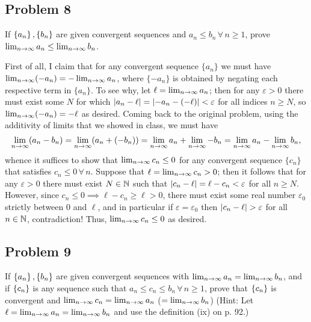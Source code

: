 \documentclass[main.tex]{subfiles}
\begin{document}
\subsection{Problem 8}
\begin{claim}
    If $\left\{ a_n \right\}, \left\{ b_n \right\}$ are given convergent sequences and $a_n \le b_n \,\forall\, n \ge 1$, prove $\lim_{n\to \infty} a_n \le \lim_{n\to \infty} b_n$.
\end{claim}

\begin{soln}
    First of all, I claim that for any convergent sequence $\{a_n\}$ we must have $\lim_{n\to \infty} (-a_n) = -\lim_{n\to \infty} a_n$, where $\{-a_n\}$ is obtained by negating each respective term in $\{a_n\}$. To see why, let $\ell = \lim_{n\to \infty} a_n$; then for any $\varepsilon > 0$ there must exist some $N$ for which $\left\lvert a_n - \ell \right\rvert = \left\lvert -a_n - (-\ell) \right\rvert < \varepsilon$ for all indices $n\ge N$, so $\lim_{n\to \infty}(-a_n) = -\ell$ as desired. Coming back to the original problem, using the additivity of limits that we showed in class, we must have
    \[\lim_{n\to \infty} (a_n - b_n) = \lim_{n\to \infty} (a_n + (-b_n)) = \lim_{n\to \infty} a_n + \lim_{n\to \infty} -b_n = \lim_{n\to \infty} a_n - \lim_{n\to \infty} b_n,\]
    whence it suffices to show that $\lim_{n\to \infty} c_n \le 0$ for any convergent sequence $\{c_n\}$ that satisfies $c_n\le 0\,\forall\, n$. Suppose that $\ell = \lim_{n\to \infty} c_n > 0$; then it follows that for any $\varepsilon > 0$ there must exist $N\in \mathbb N$ such that $\left\lvert c_n - \ell \right\rvert = \ell - c_n < \varepsilon$ for all $n\ge N$. However, since $c_n \le 0 \implies \ell - c_n \ge \ell > 0$, there must exist some real number $\varepsilon_0$ strictly between 0 and $\ell$, and in particular if $\varepsilon = \varepsilon_0$ then $\left\lvert c_n - \ell \right\rvert > \varepsilon$ for all $n\in \mathbb N$, contradiction! Thus, $\lim_{n\to \infty} c_n \le 0$ as desired.
\end{soln}
\eject

\subsection{Problem 9}
\begin{claim}
    If $\left\{ a_n \right\}, \left\{ b_n \right\}$ are given convergent sequences with $\lim_{n\to \infty} a_n = \lim_{n\to \infty} b_n$, and if $\left\{ c_n \right\}$ is any sequence such that $a_n \le c_n \le b_n \,\forall\, n \ge 1$, prove that $\left\{ c_n \right\}$ is convergent and $\lim_{n\to \infty} c_n = \lim_{n\to \infty} a_n$ ($= \lim_{n\to \infty} b_n$) (Hint: Let $\ell = \lim_{n\to \infty} a_n = \lim_{n\to \infty} b_n$ and use the definition (ix) on p. 92.)
\end{claim}
\end{document}
